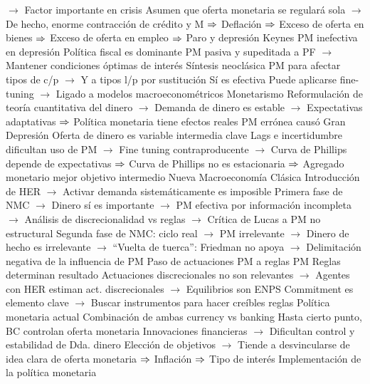 \documentclass{nuevotema}
\begin{document}
\begin{esquemal}
				\4[] $\to$ Factor importante en crisis
				\4[] Asumen que oferta monetaria se regulará sola
				\4[] $\to$ De hecho, enorme contracción de crédito y M
				\4[] $\then$ Deflación
				\4[] $\then$ Exceso de oferta en bienes
				\4[] $\then$ Exceso de oferta en empleo
				\4[] $\then$ Paro y depresión
			\3 Keynes
				\4 PM inefectiva en depresión
				\4[] Política fiscal es dominante
				\4[] PM pasiva y supeditada a PF
				\4[] $\to$ Mantener condiciones óptimas de interés
				\4 Síntesis neoclásica
				\4[] PM para afectar tipos de c/p
				\4[] $\to$ Y a tipos l/p por sustitución
				\4[] Sí es efectiva
				\4[] Puede aplicarse fine-tuning
				\4[] $\to$ Ligado a modelos macroeconométricos
			\3 Monetarismo
				\4 Reformulación de teoría cuantitativa del dinero
				\4[] $\to$ Demanda de dinero es estable
				\4[] $\to$ Expectativas adaptativas
				\4[] $\then$ Política monetaria tiene efectos reales
				\4 PM errónea causó Gran Depresión
				\4[] Oferta de dinero es variable intermedia clave
				\4 Lags e incertidumbre dificultan uso de PM
				\4[] $\to$ Fine tuning contraproducente
				\4[] $\to$ Curva de Phillips depende de expectativas
				\4[] $\then$ Curva de Phillips no es estacionaria
				\4[] $\then$ Agregado monetario mejor objetivo intermedio
			\3 Nueva Macroeconomía Clásica
				\4 Introducción de HER
				\4[] $\to$ Activar demanda sistemáticamente es imposible
				\4 Primera fase de NMC
				\4[] $\to$ Dinero sí es importante
				\4[] $\to$ PM efectiva por información incompleta
				\4[] $\to$ Análisis de discrecionalidad vs reglas
				\4[] $\to$ Crítica de Lucas a PM no estructural
				\4 Segunda fase de NMC: ciclo real
				\4[] $\to$ PM irrelevante
				\4[] $\to$ Dinero de hecho es irrelevante
				\4[] $\to$ ``Vuelta de tuerca'': Friedman no apoya
				\4[] $\to$ Delimitación negativa de la influencia de PM
				\4[$\then$] Paso de actuaciones PM a reglas PM
				\4[] Reglas determinan resultado
				\4[] Actuaciones discrecionales no son relevantes
				\4[] $\to$ Agentes con HER estiman act. discrecionales
				\4[] $\to$ Equilibrios son ENPS
				\4[] Commitment es elemento clave
				\4[] $\to$ Buscar instrumentos para hacer creíbles reglas
			\3 Política monetaria actual
				\4 Combinación de ambas currency vs banking
				\4[] Hasta cierto punto, BC controlan oferta monetaria
				\4[] Innovaciones financieras
				\4[] $\to$ Dificultan control y estabilidad de Dda. dinero
				\4 Elección de objetivos
				\4[] $\to$ Tiende a desvincularse de idea clara de oferta monetaria
				\4[] $\then$ Inflación
				\4[] $\then$ Tipo de interés
		\2 Implementación de la política monetaria

\end{esquemal}
\end{document}

